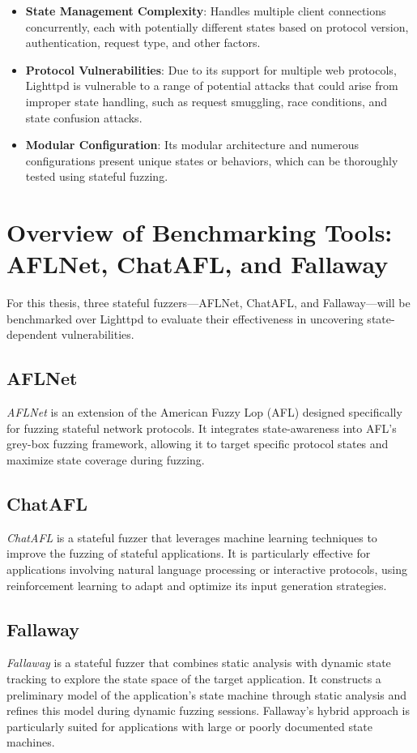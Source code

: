 \begin{itemize}
    \item \textbf{State Management Complexity}: Handles multiple client connections concurrently, each with potentially different states based on protocol version, authentication, request type, and other factors.
    
    \item \textbf{Protocol Vulnerabilities}: Due to its support for multiple web protocols, Lighttpd is vulnerable to a range of potential attacks that could arise from improper state handling, such as request smuggling, race conditions, and state confusion attacks.
    
    \item \textbf{Modular Configuration}: Its modular architecture and numerous configurations present unique states or behaviors, which can be thoroughly tested using stateful fuzzing.
\end{itemize}

\section{Overview of Benchmarking Tools: AFLNet, ChatAFL, and Fallaway}

For this thesis, three stateful fuzzers—AFLNet, ChatAFL, and Fallaway—will be benchmarked over Lighttpd to evaluate their effectiveness in uncovering state-dependent vulnerabilities.

\subsection{AFLNet}
\textit{AFLNet} is an extension of the American Fuzzy Lop (AFL) designed specifically for fuzzing stateful network protocols. It integrates state-awareness into AFL's grey-box fuzzing framework, allowing it to target specific protocol states and maximize state coverage during fuzzing.

\subsection{ChatAFL}
\textit{ChatAFL} is a stateful fuzzer that leverages machine learning techniques to improve the fuzzing of stateful applications. It is particularly effective for applications involving natural language processing or interactive protocols, using reinforcement learning to adapt and optimize its input generation strategies.

\subsection{Fallaway}
\textit{Fallaway} is a stateful fuzzer that combines static analysis with dynamic state tracking to explore the state space of the target application. It constructs a preliminary model of the application's state machine through static analysis and refines this model during dynamic fuzzing sessions. Fallaway's hybrid approach is particularly suited for applications with large or poorly documented state machines.

